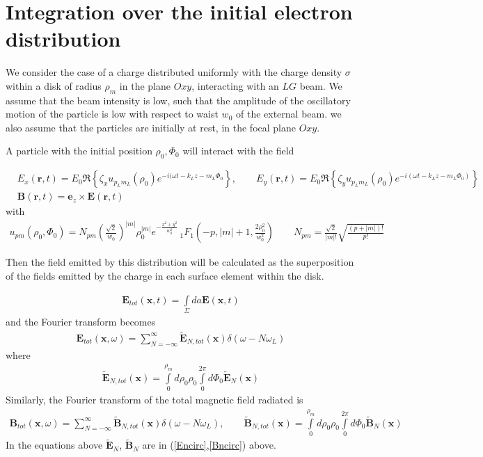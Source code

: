 \section{Integration over the initial electron distribution}

We consider the case of a charge distributed uniformly with the charge density $\sigma$ within a disk of radius $\rho_m$ in the plane $Oxy$, interacting with an $LG$ beam. We assume that the beam intensity is low, such that the amplitude of the oscillatory motion of the particle is low with respect to waist $w_0$ of the external beam. we also assume that the particles are initially at rest, in the focal plane $Oxy$.

A particle with the initial position $\rho_0, \varPhi_0$ will interact with the field

\begin{align}
  & E_x({\bm r},t) = E_0\Re\left\{\zeta_x u_{p_Lm_L}(\rho_0)e^{-i(\omega t-k_Lz-m_L\varPhi_0}\right\},\qquad
    E_y({\bm r},t) = E_0\Re\left\{\zeta_y u_{p_Lm_L}(\rho_0)e^{-i(\omega t-k_Lz-m_L\varPhi_0)}\right\}          \\
    & {\bm B}({\bm r},t) = {\bm e}_z\times{\bm E}({\bm r},t)
  \end{align}
  with
  \begin{align}
    u_{pm}(\rho_0,\varPhi_0) = N_{pm}\left(\frac{\sqrt{2}}{w_0}\right)^{|m|}\rho_0^{|m|}e^{-\frac{x^2+y^2}{w_0^2}}\, _1F_1(-p, |m|+1, \frac{2\rho_0^2}{w_0^2})
    \qquad      N_{pm} = \frac{\sqrt{2}}{|m|!}\sqrt{\frac{(p+|m|)!}{p!}}
  \end{align}

  Then the field emitted by this distribution will be calculated as the superposition of the fields emitted by the charge in each surface element within the disk.

  \begin{align}
    {\bm E}_{tot}({\bm x},t) = \int \limits_{\Sigma} da {\bm E}({\bm x},t)
  \end{align}
  and the Fourier transform becomes
  \begin{align}
    {\bm E}_{tot}({\bm x},\omega) = \sum\limits_{N=-\infty}^{\infty} \tilde{\bm E}_{N,tot}({\bm x})\delta(\omega-N\omega_L)
  \end{align}
  where
  \begin{align}
    \tilde {\bm E}_{N,tot}({\bm x})=\int\limits_0^{\rho_m}d\rho_0\rho_0\int\limits_0^{2\pi}d\varPhi_0 \tilde{\bm E}_N({\bm x})\label{int-En}
  \end{align}
  Similarly, the Fourier transform of the total magnetic field radiated is
  \begin{align}
    {\bm B}_{tot}({\bm x},\omega) = \sum\limits_{N=-\infty}^{\infty} \tilde{\bm B}_{N,tot}({\bm x})\delta(\omega-N\omega_L) ,\qquad    \tilde {\bm B}_{N,tot}({\bm x})=\int\limits_0^{\rho_m}d\rho_0\rho_0\int\limits_0^{2\pi}d\varPhi_0 \tilde{\bm B}_N({\bm x})
  \end{align}
  In the equations above $\tilde{\bm E}_N$, $\tilde {\bm B}_N$ are in (\ref{Encirc},\ref{Bncirc}) above.

